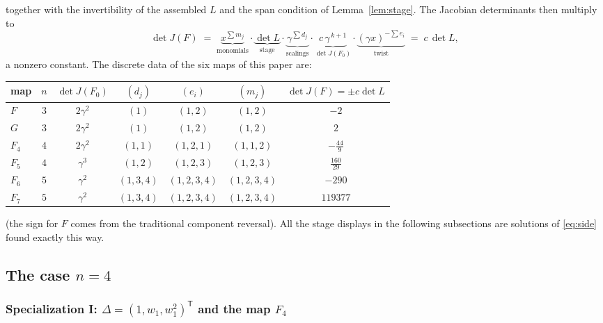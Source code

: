 \documentclass[11pt]{article}
\theoremstyle{plain}
\theoremstyle{definition}
\theoremstyle{remark}
\begin{document}
together with the invertibility of the assembled $L$ and the span condition of
Lemma~\ref{lem:stage}. The Jacobian determinants then multiply to
\begin{equation}\label{eq:chain}
\det J(F)\;=\;
\underbrace{x^{\sum m_j}}_{\text{monomials}}\cdot
\underbrace{\det L}_{\text{stage}}\cdot
\underbrace{\gamma^{\sum d_j}}_{\text{scalings}}\cdot
\underbrace{c\,\gamma^{\,k+1}}_{\det J(F_0)}\cdot
\underbrace{(\gamma x)^{-\sum e_i}}_{\text{twist}}
\;=\;c\,\det L ,
\end{equation}
a nonzero constant. The discrete data of the six maps of this paper are:
\begin{center}
\begin{tabular}{lcccccc}
\hline
map & $n$ & $\det J(F_0)$ & $(d_j)$ & $(e_i)$ & $(m_j)$ & $\det J(F)=\pm c\det L$\\
\hline
$F$   & $3$ & $2\gamma^2$ & $(1)$     & $(1,2)$     & $(1,2)$     & $-2$\\
$G$   & $3$ & $2\gamma^2$ & $(1)$     & $(1,2)$     & $(1,2)$     & $2$\\
$F_4$ & $4$ & $2\gamma^2$ & $(1,1)$   & $(1,2,1)$   & $(1,1,2)$   & $-\tfrac{44}{9}$\\
$F_5$ & $4$ & $\gamma^3$  & $(1,2)$   & $(1,2,3)$   & $(1,2,3)$   & $\tfrac{160}{29}$\\
$F_6$ & $5$ & $\gamma^2$  & $(1,3,4)$ & $(1,2,3,4)$ & $(1,2,3,4)$ & $-290$\\
$F_7$ & $5$ & $\gamma^2$  & $(1,3,4)$ & $(1,2,3,4)$ & $(1,2,3,4)$ & $119377$\\
\hline
\end{tabular}
\end{center}
(the sign for $F$ comes from the traditional component reversal). All the
stage displays in the following subsections are solutions of
\eqref{eq:side} found exactly this way.

\subsection{The case $n=4$}\label{subsec:n4}

\subsubsection{Specialization I: $\Delta=(1,w_1,w_1^2)^{\mathsf T}$ and the map $F_4$}
\label{subsec:specI}
\end{document}
